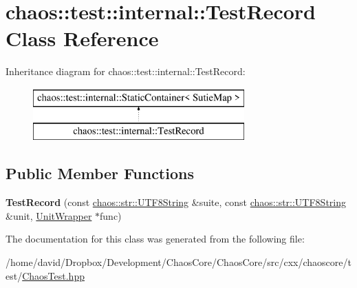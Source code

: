 \hypertarget{classchaos_1_1test_1_1internal_1_1_test_record}{\section{chaos\-:\-:test\-:\-:internal\-:\-:Test\-Record Class Reference}
\label{classchaos_1_1test_1_1internal_1_1_test_record}
}
Inheritance diagram for chaos\-:\-:test\-:\-:internal\-:\-:Test\-Record\-:\begin{figure}[H]
\begin{center}
\leavevmode
\includegraphics[height=2.000000cm]{classchaos_1_1test_1_1internal_1_1_test_record}
\end{center}
\end{figure}
\subsection*{Public Member Functions}
\begin{DoxyCompactItemize}
\item 
\hypertarget{classchaos_1_1test_1_1internal_1_1_test_record_a78ccb0b21018a0f55ca9a74143787919}{{\bfseries Test\-Record} (const \hyperlink{classchaos_1_1str_1_1_u_t_f8_string}{chaos\-::str\-::\-U\-T\-F8\-String} \&suite, const \hyperlink{classchaos_1_1str_1_1_u_t_f8_string}{chaos\-::str\-::\-U\-T\-F8\-String} \&unit, \hyperlink{structchaos_1_1test_1_1internal_1_1_unit_wrapper}{Unit\-Wrapper} $\ast$func)}\label{classchaos_1_1test_1_1internal_1_1_test_record_a78ccb0b21018a0f55ca9a74143787919}

\end{DoxyCompactItemize}


The documentation for this class was generated from the following file\-:\begin{DoxyCompactItemize}
\item 
/home/david/\-Dropbox/\-Development/\-Chaos\-Core/\-Chaos\-Core/src/cxx/chaoscore/test/\hyperlink{_chaos_test_8hpp}{Chaos\-Test.\-hpp}\end{DoxyCompactItemize}
